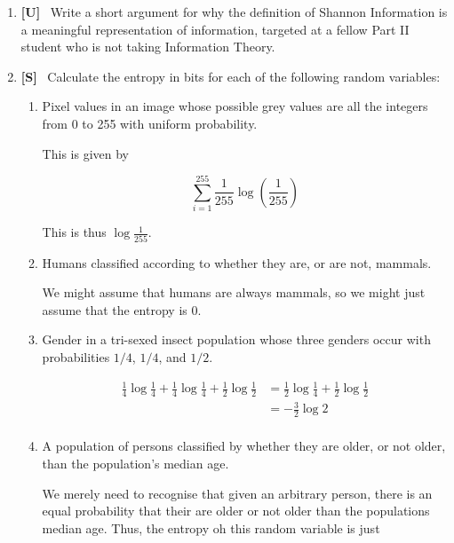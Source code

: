 \documentclass[10pt,\jkfside,a4paper]{article}
\newcommand{\answer}[1]{
    \begin{tcolorbox}[colframe=black, colback=white, sharp corners, boxrule=0.2mm, breakable]
        #1
    \end{tcolorbox}
}
\newcommand{\qtype}[1]{\textbf{[#1]}~}
\begin{document}
\begin{enumerate}
    \item
    \qtype{U}
    Write a short argument for why the definition of Shannon Information is a meaningful representation of information, targeted at a fellow Part II student who is not taking Information Theory.

    \answer{
    }

    \item
    \qtype{S}
    Calculate the entropy in bits for each of the following random variables:
    \begin{enumerate}
        \item
        Pixel values in an image whose possible grey values are all the integers from 0 to 255 with uniform probability.

        \answer{
            This is given by

            \[
                \sum_{i=1}^{255} \frac{1}{255} \log(\frac{1}{255})
            \]

            This is thus $\log{\frac{1}{255}}$. 
        }

        \item
        Humans classified according to whether they are, or are not, mammals.

        \answer{
            We might assume that humans are always mammals, so we might just assume that the entropy is 0.
        }

        \item
        Gender in a tri-sexed insect population whose three genders occur with probabilities $1/4$, $1/4$, and $1/2$.

        \answer{
            \begin{align*}
                \frac{1}{4} \log{\frac{1}{4}} + \frac{1}{4} \log{\frac{1}{4}} + \frac{1}{2} \log{\frac{1}{2}} &= 
                \frac{1}{2} \log{\frac{1}{4}} + \frac{1}{2} \log{\frac{1}{2}} \\ 
                &= - \frac{3}{2} \log{2} \\ 
            \end{align*}
        }

        \item
        A population of persons classified by whether they are older, or not older, than the population's median age.

        \answer{
            We merely need to recognise that given an arbitrary person, there is an equal probability that their are older or not older than the populations median age. Thus, the entropy oh this random variable is just 

}
\end{enumerate}
\end{enumerate}
\end{document}
